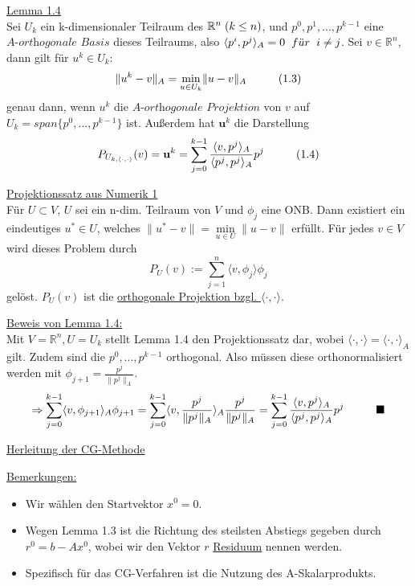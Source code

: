\documentclass[a4paper]{letter}
\begin{document}
\underline{Lemma 1.4}
\\Sei $U_{k}$ ein k-dimensionaler Teilraum des $\mathbb{R}^{n} \hspace{1mm} (k \le n)$, und $p^{0}, p^{1},...,p^{k-1}$ eine $\textit{A-orthogonale Basis}$ dieses Teilraums, also $\langle p^{i}, p^{j} \rangle _{A} = 0 \hspace{2mm} f\ddot{u}r \hspace{2mm} i \ne j$. Sei $v \in \mathbb{R}^{n}$, dann gilt f\"ur $u^{k} \in U_{k}$:
$$\|u^{k} - v\|_{A} = \underset{u \in U_{k}}{\min} \|u - v\|_{A} \hspace{10mm}(1.3)$$
genau dann, wenn $u^{k}$ die $\textit{A-orthogonale Projektion}$ von $v$ auf $U_{k} = span\{p^{0},...,p^{k-1}\}$ ist. Au{\ss}erdem hat $\textbf{u}^{k}$ die Darstellung
$$P_{U_{k,\langle \cdot,\cdot \rangle}}(v) = \textbf{u}^{k} = \sum_{j=0}^{k-1} \frac {\langle v, p^{j} \rangle _{A}} {\langle p^{j}, p^{j} \rangle _{A}} p^{j} \hspace{10mm}(1.4)$$

\underline{Projektionssatz aus Numerik 1}
\\F\"ur $U \subset V$, $U$ sei ein n-dim. Teilraum von $V$ und $\phi_{j}$ eine ONB. Dann existiert ein eindeutiges $u^{*} \in U$, welches $\|u^{*} - v\| = \underset{u \in U}{\min} \|u - v\|$ erf\"ullt. F\"ur jedes $v \in V$ wird dieses Problem durch
$$P_{U}(v) := \sum_{j=1}^{n} \langle v, \phi_{j} \rangle \phi_{j}$$
gel\"ost. $P_{U}(v)$ ist die \underline{orthogonale Projektion bzgl. $\langle \cdot, \cdot \rangle$}.

\underline{Beweis von Lemma 1.4:}
\\Mit $V = \mathbb{R}^{n}, U = U_{k}$ stellt Lemma 1.4 den Projektionssatz dar, wobei $\langle \cdot, \cdot \rangle = \langle \cdot, \cdot \rangle _{A}$ gilt. Zudem sind die $p^{0},...,p^{k-1}$ orthogonal. Also m\"ussen diese orthonormalisiert werden mit $\phi_{j+1} = \frac {p^{j}} {\|p^{j}\|_{A}}$.
$$\Rightarrow \sum_{j=0}^{k-1} \langle v, \phi_{j+1} \rangle _{A} \phi_{j+1} =
\sum_{j=0}^{k-1} \langle v, {\frac {p^{j}} {\|p^{j}\|_{A}}} \rangle _{A} \frac {p^{j}} {\|p^{j}\|_{A}} =
\sum_{j=0}^{k-1} \frac {\langle v, p^{j} \rangle _{A}} {\langle p^{j}, p^{j} \rangle _{A}} p^{j} \hspace{10mm} \blacksquare$$

\begin{center}
\underline{Herleitung der CG-Methode}
\end{center}
\underline{Bemerkungen:}
\begin{itemize}
	\item Wir w\"ahlen den Startvektor $x^{0} = 0$.
	\item Wegen Lemma 1.3 ist die Richtung des steilsten Abstiegs gegeben durch $r^{0} = b - Ax^{0}$, wobei wir den Vektor $r$ \underline{Residuum} nennen werden.
	\item Spezifisch f\"ur das CG-Verfahren ist die Nutzung des A-Skalarprodukts.
\end{itemize}
\end{document}
